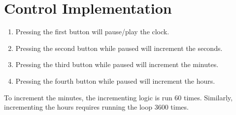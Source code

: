 \section{Control Implementation}
\begin{enumerate}
    \item Pressing the first button will pause/play the clock.
    \item Pressing the second button while paused will increment the seconds.
    \item Pressing the third button while paused will increment the minutes.
    \item Pressing the fourth button while paused will increment the hours.
\end{enumerate}

To increment the minutes, the incrementing logic is run 60 times. Similarly, incrementing the hours requires running the loop 3600 times.
